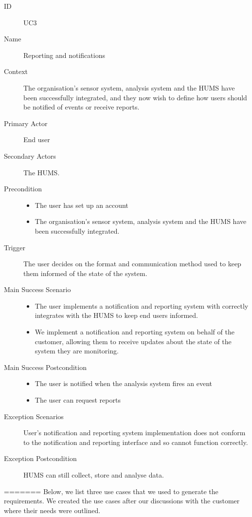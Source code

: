 \documentclass[10pt,a4paper]{article}
\begin{document}
\begin{description}
	\item[ID] UC3
	\item[Name] Reporting and notifications
	\item[Context] The organisation's sensor system, analysis system and the HUMS
	               have been successfully integrated, and they now wish to define
	               how users should be notified of events or receive reports.
	\item[Primary Actor] End user
	\item[Secondary Actors] The HUMS.
	\item[Precondition]
			\begin{itemize}
			\item The user has set up an account
			\item The organisation's sensor system, analysis system and the HUMS have
			      been successfully integrated.
			\end{itemize}
	\item[Trigger] The user decides on the format and communication method used
	               to keep them informed of the state of the system.
	\item[Main Success Scenario]
			\begin{itemize}
				\item The user implements a notification and reporting system with
				      correctly integrates with the HUMS to keep end users informed.
				\item We implement a notification and reporting system on behalf of the
				      customer, allowing them to receive updates about the state of the
				      system they are monitoring.
			\end{itemize}
	\item[Main Success Postcondition]
			\begin{itemize}
				\item The user is notified when the analysis system fires an event
				\item The user can request reports
			\end{itemize}
	\item[Exception Scenarios] User's notification and reporting system
			implementation does not conform to the notification and reporting
			interface and so cannot function correctly.
	\item[Exception Postcondition] HUMS can still collect, store and analyse data.
\end{description}
=======
Below, we list three use cases that we used to generate the requirements. We created the use cases after our discussions with the customer where their needs were outlined.\\
\end{document}
